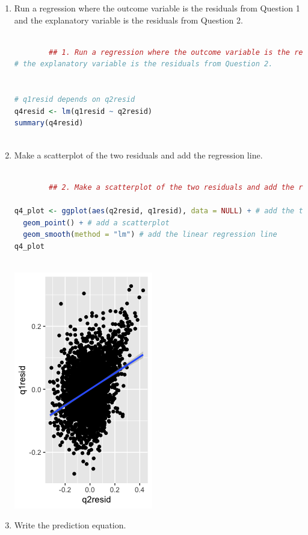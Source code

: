 \documentclass[12pt,letterpaper]{article}
\begin{document}
	\begin{enumerate}
		\item Run a regression where the outcome variable is the residuals from Question 1 and the explanatory variable is the residuals from Question 2.	\vspace{6cm}
		
		\begin{lstlisting}[language=R]
		
		## 1. Run a regression where the outcome variable is the residuals from Question 1 and 
# the explanatory variable is the residuals from Question 2.


# q1resid depends on q2resid
q4resid <- lm(q1resid ~ q2resid)
summary(q4resid)
		
		\end{lstlisting}
		
		\item Make a scatterplot of the two residuals and add the regression line. 	\vspace{6cm}
		
		
		\begin{lstlisting}[language=R]
		
		## 2. Make a scatterplot of the two residuals and add the regression line

q4_plot <- ggplot(aes(q2resid, q1resid), data = NULL) + # add the two residuals
  geom_point() + # add a scatterplot
  geom_smooth(method = "lm") # add the linear regression line
q4_plot
		
		\end{lstlisting}
		
		\includegraphics[scale=0.85]{plot_4.png}
		
		
		\item Write the prediction equation.
	\end{enumerate}
	
\end{document}
